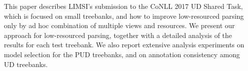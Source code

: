 This paper describes LIMSI's submission to the CoNLL 2017 UD Shared Task, which is focused on small treebanks, and how to improve low-resourced parsing only by ad hoc combination of multiple views and resources. We present our approach for low-resourced parsing, together with a detailed analysis of the results for each test treebank. We also report extensive analysis experiments on model selection for the PUD treebanks, and on annotation consistency among UD treebanks.
